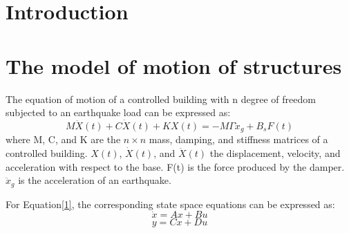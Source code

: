 

\date{Received: date / Accepted: date}


\maketitle


\begin{abstract}





\end{abstract}

\section{Introduction}

\section{The model of motion of structures}
The equation of motion of a controlled building with n degree of freedom subjected to an earthquake load can be expressed as:
\begin{equation}M\ddot{X}(t)+C\dot{X}(t)+KX(t)=-M\Gamma\ddot{x}_g+B_sF(t)\end{equation}\label{1}
where M, C, and K are the $n \times n$  mass, damping, and stiffness matrices of a controlled building. $X(t)$, $\dot{X}(t)$, and $\ddot{X}(t)$ the displacement, velocity, and acceleration with respect to the base.
F(t) is the force produced by the damper. $\ddot{x}_g$ is the acceleration of an earthquake. 

For Equation\ref{1}, the corresponding state space equations can be expressed as:
\begin{equation}\dot{x}=Ax+Bu\end{equation}
\begin{equation}y=Cx+Du\end{equation}

